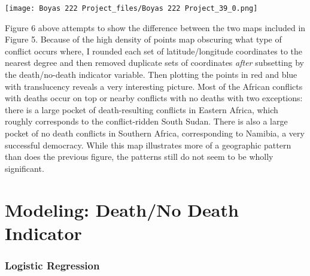 \documentclass[letterpaper,10pt,english]{/usr/share/sphinx/texinputs/sphinxhowto}
\newenvironment{InvisibleVerbatim}
        {\begin{mdframed}[leftmargin=0.1\linewidth,innerleftmargin=3pt,innerrightmargin=3pt, userdefinedwidth=1\linewidth, linewidth=0pt, linecolor=white, usetwoside=false]}
        {\end{mdframed}}
\begin{document}
    

        
        

            
                \begin{InvisibleVerbatim}
                \vspace{-0.5\baselineskip}
    \begin{center}
    \texttt{[image: Boyas 222 Project\_files/Boyas 222 Project\_39\_0.png]}
    \par
    \end{center}
    
            \end{InvisibleVerbatim}
            
        
    
Figure 6 above attempts to show the difference between the two maps
included in Figure 5. Because of the high density of points map
obscuring what type of conflict occurs where, I rounded each set of
latitude/longitude coordinates to the nearest degree and then removed
duplicate sets of coordinates \emph{after} subsetting by the
death/no-death indicator variable. Then plotting the points in red and
blue with translucency reveals a very interesting picture. Most of the
African conflicts with deaths occur on top or nearby conflicts with no
deaths with two exceptions: there is a large pocket of death-resulting
conflicts in Eastern Africa, which roughly corresponds to the
conflict-ridden South Sudan. There is also a large pocket of no death
conflicts in Southern Africa, corresponding to Namibia, a very
successful democracy. While this map illustrates more of a geographic
pattern than does the previous figure, the patterns still do not seem to
be wholly significant.\section{Modeling: Death/No Death Indicator}\subsubsection{Logistic Regression}

\end{document}
